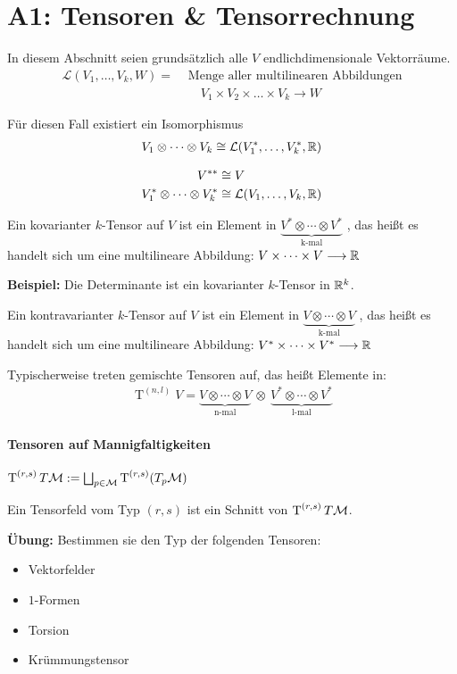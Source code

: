 \chapter*{A1: Tensoren \& Tensorrechnung}
In diesem Abschnitt seien grundsätzlich alle $V$ endlichdimensionale Vektorräume. \\
\begin{align*}
\mathcal{L}(V_1,\dots, V_k, W) = &\text{ Menge aller multilinearen Abbildungen} \\
&\phantom{ = } V_1 \times V_2 \times \dots \times V_k \longrightarrow W
\end{align*}

\begin{satz}
Für diesen Fall existiert ein Isomorphismus
\begin{align*}
V_1 \otimes \cdots \otimes V_k \cong \mathcal{L}(V_1^*, \dots, V_k^*, \mathbb{R})
\end{align*}
\end{satz}

\begin{bem}
\begin{align*}
V^{**} &\cong V \\
V_1^* \otimes \cdots \otimes V_k^* &\cong \mathcal{L}(V_1, \dots, V_k, \mathbb{R})
\end{align*}
\end{bem}

\begin{defs}
Ein kovarianter $k$-Tensor auf $V$ ist ein Element in $\underbrace{V^*\otimes\cdots\otimes V^*}_{\text{k-mal}}$ , das heißt es handelt sich um eine multilineare Abbildung: $ V \times \cdots \times V \longrightarrow \mathbb{R}$
\end{defs}
\textbf{Beispiel:} Die Determinante ist ein kovarianter $k$-Tensor in $\mathbb{R}^k$.
\begin{defs}
Ein kontravarianter $k$-Tensor auf $V$ ist ein Element in $\underbrace{V\otimes\cdots\otimes V}_{\text{k-mal}}$ , das heißt es handelt sich um eine multilineare Abbildung: $ V^*\times \cdots \times V^* \longrightarrow \mathbb{R}$
\end{defs}
Typischerweise treten gemischte Tensoren auf, das heißt Elemente in:
\begin{align*}
\operatorname{T}^{(n, l)}V = \underbrace{V\otimes\cdots\otimes V}_{\text{n-mal}} \ \otimes \  \underbrace{V^*\otimes\cdots\otimes V^*}_{\text{l-mal}}
\end{align*}

\subsubsection*{Tensoren auf Mannigfaltigkeiten}
$\operatorname{T}^{(r, s)}T\mathcal{M}  := \bigsqcup_{p\in\mathcal{M}} \operatorname{T}^{(r, s)}(T_p\mathcal{M})$

\begin{defs}
Ein Tensorfeld vom Typ $(r,s)$ ist ein Schnitt von $\operatorname{T}^{(r, s)}T\mathcal{M}$.
\end{defs}

\textbf{Übung:} Bestimmen sie den Typ der folgenden Tensoren:
\begin{itemize}
\item Vektorfelder
\item $1$-Formen
\item Torsion
\item Krümmungstensor
\end{itemize}